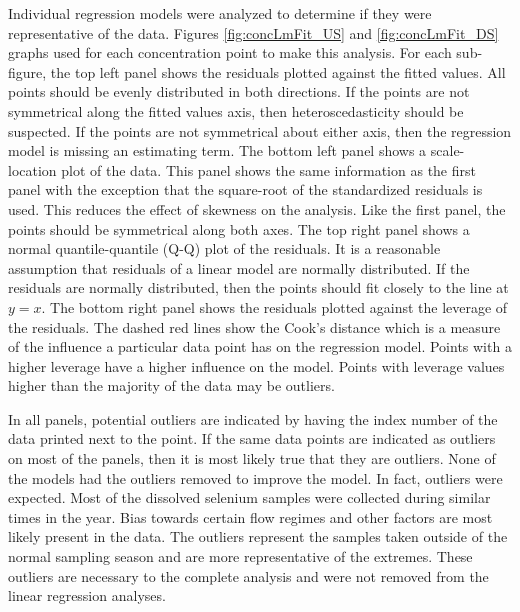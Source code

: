 Individual regression models were analyzed to determine if they were representative of the data.  Figures \ref{fig:concLmFit_US} and \ref{fig:concLmFit_DS} graphs used for each concentration point to make this analysis.  For each sub-figure, the top left panel shows the residuals plotted against the fitted values.  All points should be evenly distributed in both directions.  If the points are not symmetrical along the fitted values axis, then heteroscedasticity should be suspected.  If the points are not symmetrical about either axis, then the regression model is missing an estimating term.  The bottom left panel shows a scale-location plot of the data.  This panel shows the same information as the first panel with the exception that the square-root of the standardized residuals is used.  This reduces the effect of skewness on the analysis.  Like the first panel, the points should be symmetrical along both axes.  The top right panel shows a normal quantile-quantile (Q-Q) plot of the residuals.  It is a reasonable assumption that residuals of a linear model are normally distributed.  If the residuals are normally distributed, then the points should fit closely to the line at $y=x$.  The bottom right panel shows the residuals plotted against the leverage of the residuals.  The dashed red lines show the Cook's distance which is a measure of the influence a particular data point has on the regression model.  Points with a higher leverage have a higher influence on the model.  Points with leverage values higher than the majority of the data may be outliers.

In all panels, potential outliers are indicated by having the index number of the data printed next to the point.  If the same data points are indicated as outliers on most of the panels, then it is most likely true that they are outliers.  None of the models had the outliers removed to improve the model.  In fact, outliers were expected.  Most of the dissolved selenium samples were collected during similar times in the year.  Bias towards certain flow regimes and other factors are most likely present in the data.  The outliers represent the samples taken outside of the normal sampling season and are more representative of the extremes.  These outliers are necessary to the complete analysis and were not removed from the linear regression analyses.

